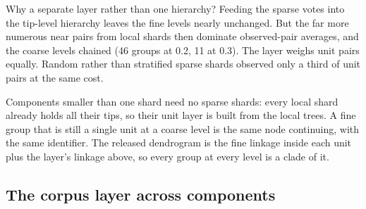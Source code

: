 \documentclass[11pt,a4paper]{article}
\begin{document}
Why a separate layer rather than one hierarchy? Feeding the sparse votes into the tip-level
hierarchy leaves the fine levels nearly unchanged. But the far more numerous near pairs from local
shards then dominate observed-pair averages, and the coarse levels chained (46 groups at 0.2, 11 at
0.3). The layer weighs unit pairs equally. Random rather than stratified sparse shards observed only
a third of unit pairs at the same cost.

Components smaller than one shard need no sparse shards: every local shard already holds all their
tips, so their unit layer is built from the local trees. A fine group that is still a single unit at
a coarse level is the same node continuing, with the same identifier. The released dendrogram is
the fine linkage inside each unit plus the layer's linkage above, so every group at every level is a
clade of it.

\subsection{The corpus layer across components}\label{sec:corpus}
\end{document}
